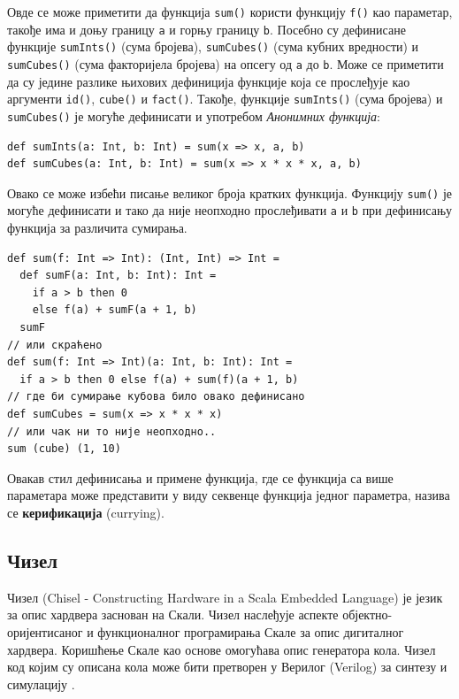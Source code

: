 \documentclass[12pt, a4paper]{article}
\theoremstyle{definition}
\begin{document}
Овде се може приметити да функција \verb+sum()+ користи функцију \verb+f()+  као параметар, такође има и доњу границу \verb+a+ и горњу границу \verb+b+. Посебно су дефинисане функције \verb+sumInts()+ (сума бројева), \verb+sumCubes()+ (сума кубних вредности) и \verb+sumCubes()+ (сума факторијела бројева) на опсегу од \verb+a+ до \verb+b+. Може се приметити да су једине разлике њихових дефиниција функције која се прослеђује као аргументи \verb+id()+, \verb+cube()+ и \verb+fact()+.
Такође, функције \verb+sumInts()+ (сума бројева) и \verb+sumCubes()+ је могуће дефинисати и употребом \textit{Анонимних функција}:
\begin{verbatim}
def sumInts(a: Int, b: Int) = sum(x => x, a, b)
def sumCubes(a: Int, b: Int) = sum(x => x * x * x, a, b)
\end{verbatim}
Овако се може избећи писање великог броја кратких функција. Функцију \verb+sum()+ је могуће дефинисати и тако да није неопходно прослеђивати \verb+a+ и \verb+b+ при дефинисању функција за различита сумирања.
\begin{verbatim}
def sum(f: Int => Int): (Int, Int) => Int =
  def sumF(a: Int, b: Int): Int =
    if a > b then 0
    else f(a) + sumF(a + 1, b)
  sumF
// или скраћено
def sum(f: Int => Int)(a: Int, b: Int): Int =
  if a > b then 0 else f(a) + sum(f)(a + 1, b)
// где би сумирање кубова било овако дефинисано
def sumCubes = sum(x => x * x * x)
// или чак ни то није неопходно..
sum (cube) (1, 10)
\end{verbatim}
Овакав стил дефинисања и примене функција, где се функција са више параметара може представити у виду секвенце функција једног параметра, назива се \textbf{керификација} (currying).

\newpage

\subsection{Чизел}
Чизел (Chisel - Constructing Hardware in a Scala Embedded Language) је језик за опис хардвера заснован на Скали. Чизел наслеђује аспекте објектно-оријентисаног и функционалног програмирања Скале за опис дигиталног хардвера. Коришћење Скале као основе омогућава опис генератора кола. Чизел код којим су описана кола може бити претворен у Верилог (Verilog) за синтезу и симулацију \cite{wiki_chisel}.
\end{document}
